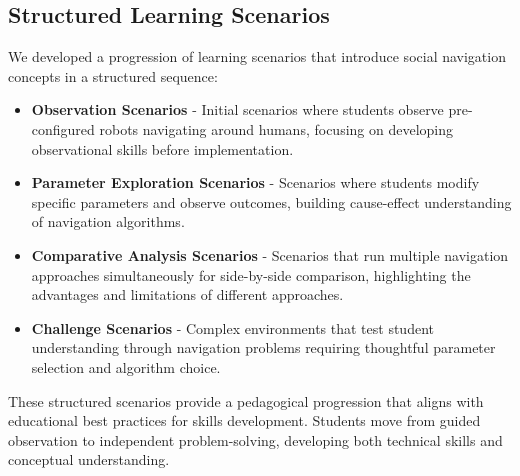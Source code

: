\subsection{Structured Learning Scenarios}
We developed a progression of learning scenarios that introduce social navigation concepts 
in a structured sequence:
\begin{itemize}
    \item \textbf{Observation Scenarios} - Initial scenarios where students observe 
    pre-configured robots navigating around humans, focusing on developing observational 
    skills before implementation.
    \item \textbf{Parameter Exploration Scenarios} - Scenarios where students modify specific 
    parameters and observe outcomes, building cause-effect understanding of navigation algorithms.
    \item \textbf{Comparative Analysis Scenarios} - Scenarios that run multiple navigation 
    approaches simultaneously for side-by-side comparison, highlighting the advantages and 
    limitations of different approaches.
    \item \textbf{Challenge Scenarios} - Complex environments that test student understanding 
    through navigation problems requiring thoughtful parameter selection and algorithm choice.
\end{itemize}
These structured scenarios provide a pedagogical progression that aligns with educational 
best practices for skills development. Students move from guided observation to independent 
problem-solving, developing both technical skills and conceptual understanding.

